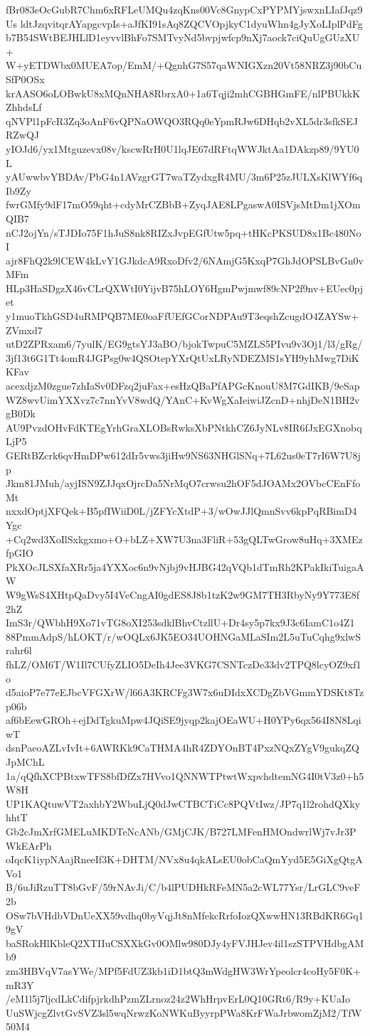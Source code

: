 fBr083eOcGubR7Chm6xRFLeUMQu4zqKns00Vc8GnypCxPYPMYjswxnLIafJqz9Us
ldtJzqvitqrAYapgcvpIs+aJfKI91sAq8ZQCVOpjkyC1dyuWhn4gJyXoLIplPdFg
b7B54SWtBEJHLlD1eyvvlBhFo7SMTvyNd5bvpjwfcp9nXj7aock7ciQuUgGUzXU+
W+yETDWbx0MUEA7op/EmM/+QgnhG7S57qaWNIGXzn20Vt58NRZ3j90bCuSfP0OSx
krAASO6oLOBwkU8xMQnNHA8RbrxA0+1a6Tqji2mhCGBHGmFE/nlPBUkkKZhhdsLf
qNVPl1pFcR3Zq3oAnF6vQPNaOWQO3RQq0eYpmRJw6DHqb2vXL5dr3sfkSEJRZwQJ
yIOJd6/yx1Mtguzevx08v/kscwRrH0U1lqJE67dRFtqWWJktAa1DAkzp89/9YU0L
yAUwwbvYBDAv/PbG4n1AVzgrGT7waTZydxgR4MU/3m6P25zJULXsKlWYf6qIb9Zy
fwrGMfy9dF17mO59qht+cdyMrCZBbB+ZyqJAE8LPgaswA0ISVjsMtDm1jXOmQIB7
nCJ2ojYn/sTJDIo75F1hJuS8nk8RIZxJvpEGfUtw5pq+tHKcPKSUD8x1Bc480NoI
ajr8FhQ2k9lCEW4kLvY1GJkdcA9RxoDfv2/6NAmjG5KxqP7GhJdOPSLBvGn0vMFm
HLp3HaSDgzX46vCLrQXWtI0YijvB75hLOY6HgmPwjmwf89cNP2f9nv+EUec0pjet
y1muoTkhGSD4uRMPQB7ME0oaFfUEfGCorNDPAu9T3eqshZcugdO4ZAYSw+ZVmxd7
utD2ZPRxam6/7yulK/EG9gtsYJ3aBO/bjokTwpuC5MZLS5PIvu9v3Oj1/l3/gRg/
3jf13t6G1Tt4omR4JGPsg0w4QSOtepYXrQtUxLRyNDEZMS1sYH9yhMwg7DiKKFav
acexdjzM0zgue7zhIaSv0DFzq2juFax+esHzQBaPfAPGcKnouU8M7GdIKB/9eSap
WZ8wvUimYXXvz7c7nnYvV8wdQ/YAnC+KvWgXaIeiwiJZcnD+nhjDeN1BH2vgB0Dk
AU9PvzdOHvFdKTEgYrhGraXLOBsRwksXbPNtkhCZ6JyNLv8IR6fJxEGXnobqLjP5
GERtBZcrk6qvHmDPw612dIr5vws3jiHw9NS63NHGlSNq+7L62us0eT7rI6W7U8jp
Jkm81JMuh/ayjISN9ZJJqxOjrcDa5NrMqO7crwsu2hOF5dJOAMx2OVbcCEnFfoMt
nxxdOptjXFQek+B5pfIWiiD0L/jZFYcXtdP+3/wOwJJlQmnSvv6kpPqRBimD4Ygc
+Cq2wd3XoIlSxkgxmo+O+bLZ+XW7U3na3FliR+53gQLTwGrow8uHq+3XMEzfpGIO
PkXOcJLSXfaXRr5ja4YXXoc6n9vNjbj9vHJBG42qVQb1dTmRh2KPakIkiTuigaAW
W9gWsS4XHtpQaDvy5I4VeCngAI0gdES8J8b1tzK2w9GM7TH3RbyNy9Y773E8f2hZ
ImS3r/QWbhH9Xo71vTG8oXI253sdklBhvCtzllU+Dr4sy5p7kx9J3c6IamC1o4Z1
88PmmAdpS/hLOKT/r/wOQLx6JK5EO34UOHNGaMLaSIm2L5uTuCqhg9xlwSrahr6l
fhLZ/OM6T/W1Il7CUfyZLIO5DeIh4Jee3VKG7CSNTczDe33dv2TPQ8lcyOZ9xf1o
d5aioP7e77eEJbcVFGXrW/l66A3KRCFg3W7x6uDIdxXCDgZbVGmmYDSKt8Tzp06b
af6bEewGROh+ejDdTgkuMpw4JQiSE9jyqp2kajOEaWU+H0YPy6qx564I8N8LqiwT
dsnPaeoAZLvIvIt+6AWRKk9CaTHMA4hR4ZDYOnBT4PxzNQxZYgV9gukqZQJpMChL
1a/qQfhXCPBtxwTFS8bfDfZx7HVvo1QNNWTPtwtWxpvhdtemNG4I0tV3z0+h5W8H
UP1KAQtuwVT2axhbY2WbuLjQ0dJwCTBCTiCc8PQVtIwz/JP7q1l2rohdQXkyhhtT
Gb2cJmXrfGMELuMKDTeNcANb/GMjCJK/B727LMFenHMOndwrlWj7vJr3PWkEArPh
oIqcK1iypNAajRneeIf3K+DHTM/NVx8u4qkALsEU0obCaQmYyd5E5GiXgQtgAVo1
B/6uJiRzuTT8bGvF/59rNAvJi/C/b4lPUDHkRFeMN5a2cWL77Ysr/LrGLC9veF2b
OSw7bVHdbVDnUeXX59vdhq0byVqjJt8nMfekcRrfoIozQXwwHN13RBdKR6Gq19gV
baSRokHlKbleQ2XTIIuCSXXkGv0OMlw980DJy4yFVJHJev4il1szSTPVHdbgAMb9
zm3HBVqV7asYWe/MPf5FdUZ3kb1iD1btQ3mWdgHW3WrYpeolcr4coHy5F0K+mR3Y
/eM1l5j7ljcdLkCdifpjrkdhPzmZLrnoz24z2WhHrpvErL0Q10GRt6/R9y+KUaIo
UuSWjcgZlvtGvSVZ3sl5wqNrwzKoNWKuByyrpPWa8KrFWaJrbwomZjM2/TfW50M4

